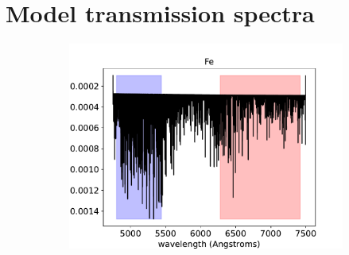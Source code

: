 \documentclass[twocolumn]{aastex631}
\begin{document}
        \section{Model transmission spectra}\label{fig:main-spectra}
            \begin{figure}[ht!]
                \centering
                \begin{subfigure}[b]{0.3\textwidth}\label{fig:Fe-spectrum}
                    \centering
                    \includegraphics[width=\textwidth]{plots/spectra/spectrum.KELT-20b.Fe.5.39e-05.inverted-transmission-better}
                    

\end{subfigure}
\end{figure}
\end{document}
